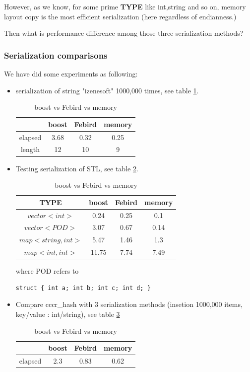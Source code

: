 \documentclass[a4paper,10pt]{article}
\begin{document}
However,  as we know, for some prime \textbf{TYPE} like int,string
and so on, memory layout copy is the most efficient serialization
(here regardless of endianness.)


Then what is performance difference among those three serialization
methods?

\subsubsection{Serialization comparisons}
We have did some experiments as following:


\begin{itemize}
 \item  serialization of string "izenesoft" 1000,000 times, see
 table \ref{table:1}.

\begin{table} \label{table:1}
\centering
\caption{boost vs Febird vs memory}
\begin{tabular}{|c|c|c|c|} \hline
   & boost & Febird & memory \\  \hline
 elapsed & 3.68 & 0.32  & 0.25 \\  \hline
 length & 12 & 10 & 9 \\
\hline
\end{tabular}
\end{table}


\item  Testing serialization of STL, see table \ref{table:2}.



\begin{table} \label{table:2}
\centering \caption{boost vs Febird vs memory}
\begin{tabular}{|c|c|c|c|} \hline
TYPE  & boost & Febird & memory \\  \hline
 $vector<int>$ & 0.24 & 0.25 & 0.1\\ \hline
 $vector<POD>$ &3.07 & 0.67 & 0.14\\ \hline
 $map<string,int>$ & 5.47 & 1.46  & 1.3\\  \hline
 $map<int, int>$ & 11.75 &7.74  & 7.49\\  \hline
\end{tabular}
\end{table}

where POD refers to
\begin{lstlisting}
struct { int a; int b; int c; int d; }
\end{lstlisting}

\item   Compare cccr\_hash with 3 serialization methods
 (insetion 1000,000 items, key/value : int/string), see table \ref{table:3}


\begin{table}
\centering \caption{boost vs Febird vs memory}  \label{table:3}
\begin{tabular}{|c|c|c|c|} \hline
  & boost & Febird & memory \\  \hline
elapsed & 2.3 & 0.83  & 0.62\\  \hline
\end{tabular}
\end{table}

\end{itemize}
\end{document}
